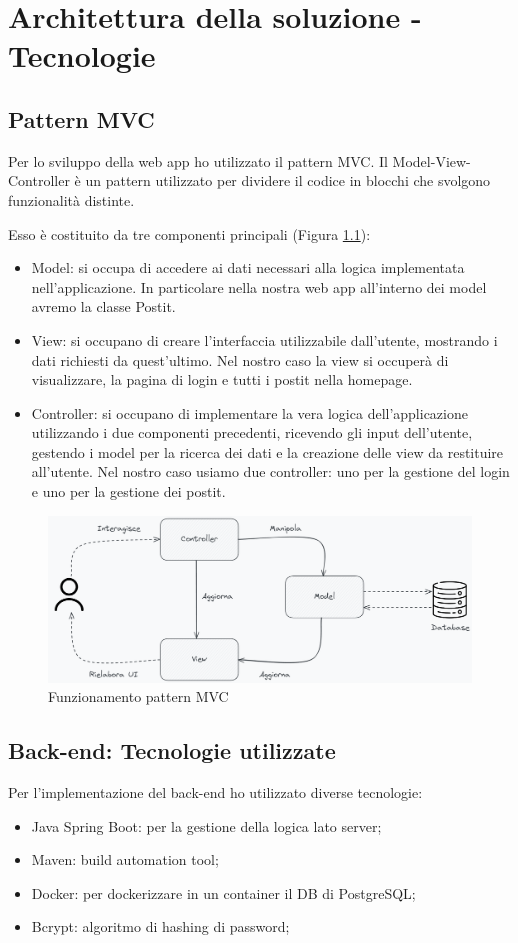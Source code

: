 \chapter{Architettura della soluzione - Tecnologie}
\section{Pattern MVC}
Per lo sviluppo della web app ho utilizzato il pattern MVC.
Il Model-View-Controller è un pattern utilizzato per dividere il codice in blocchi che svolgono funzionalità distinte.

Esso è costituito da tre componenti principali\cite{patternMVC} (Figura \ref{fig:pattern-mvc}):
\begin{itemize}
    \item Model: si occupa di accedere ai dati necessari alla logica implementata nell'applicazione. In particolare nella nostra web app all'interno dei model avremo la classe Postit.
    \item View: si occupano di creare l'interfaccia utilizzabile dall'utente, mostrando i dati richiesti da quest'ultimo. Nel nostro caso la view si occuperà di visualizzare, la pagina di login e tutti i postit nella homepage.
    \item Controller: si occupano di implementare la vera logica dell'applicazione utilizzando i due componenti precedenti, ricevendo gli input dell'utente, gestendo i model per la ricerca dei dati e la creazione delle view da restituire all'utente. Nel nostro caso usiamo due controller: uno per la gestione del login e uno per la gestione dei postit.
\end{itemize}
\begin{figure}[h]
    \centering
    \includegraphics[width=1.0\textwidth]{images/pattern mvc.png}
    \caption{Funzionamento pattern MVC}
    \label{fig:pattern-mvc}
\end{figure}

\newpage
\section{Back-end: Tecnologie utilizzate}
Per l'implementazione del back-end ho utilizzato diverse tecnologie:
\begin{itemize}
    \item Java Spring Boot: per la gestione della logica lato server;
    \item Maven: build automation tool;
    \item Docker: per dockerizzare in un container il DB di PostgreSQL;
    \item Bcrypt: algoritmo di hashing di password;
\end{itemize}


